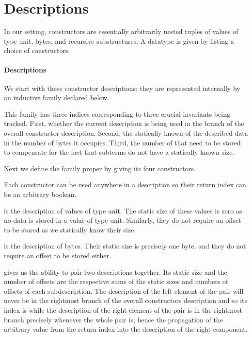 \section{Descriptions}\label{sec:desc}


In our setting, constructors are essentially arbitrarily nested tuples of
values of type unit,
bytes,
and recursive substructures.
%
A datatype is given by listing a choice of constructors.

\paragraph{Descriptions}
We start with these constructor descriptions;
they are represented internally by an inductive family 
declared below.


This family has three indices corresponding to three crucial
invariants being tracked.
%
First, whether the current description is being used in the
 branch of the overall constructor description.
%
Second, the statically known  of the described data
in the number of bytes it occupies.
%
Third, the number of  that need to be stored to
compensate for the fact that subterms do not have a statically known
size.

Next we define the family proper by giving its four constructors.


Each constructor can be used anywhere in a description so their return
 index can be an arbitrary boolean.

 is the description of values of type unit. The static
size of these values is zero as no data is stored in a value of type unit.
Similarly, they do not require an offset to be stored as we statically
know their size.

 is the description of bytes.
%
Their static size is precisely one byte, and they do not require an
offset to be stored either.

 gives us the ability to pair two descriptions together.
Its static size and the number of offsets are the respective sums of the
static sizes and numbers of offsets of each subdescription.
%
The description of the left element of the pair will never be in the
rightmost branch of the overall constructors description and so its
index is  while the description of the right element
of the pair is in the rightmost branch precisely whenever the whole pair
is; hence the propagation of the  arbitrary value from the
return index into the description of the right component.

